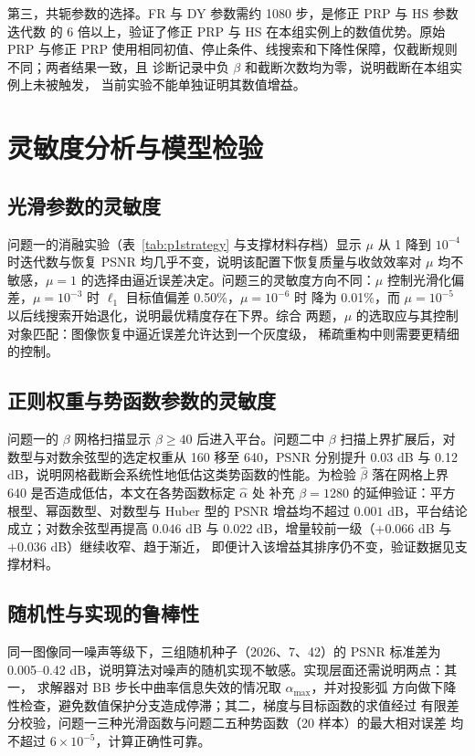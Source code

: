 \documentclass[withoutpreface,bwprint]{cumcmthesis}
\begin{document}
第三，共轭参数的选择。FR 与 DY 参数需约 1080 步，是修正 PRP 与 HS 参数迭代数
的 6 倍以上，验证了修正 PRP 与 HS 在本组实例上的数值优势。原始 PRP 与修正 PRP
使用相同初值、停止条件、线搜索和下降性保障，仅截断规则不同；两者结果一致，且
诊断记录中负 $\beta$ 和截断次数均为零，说明截断在本组实例上未被触发，
当前实验不能单独证明其数值增益。

\section{灵敏度分析与模型检验}

\subsection{光滑参数的灵敏度}

问题一的消融实验（表~\ref{tab:p1strategy} 与支撑材料存档）显示 $\mu$ 从 1 降到
$10^{-4}$ 时迭代数与恢复 PSNR 均几乎不变，说明该配置下恢复质量与收敛效率对
$\mu$ 均不敏感，$\mu=1$ 的选择由逼近误差决定。问题三的灵敏度方向不同：$\mu$
控制光滑化偏差，$\mu=10^{-3}$ 时 $\ell_1$ 目标值偏差 0.50\%，$\mu=10^{-6}$ 时
降为 0.01\%，而 $\mu=10^{-5}$ 以后线搜索开始退化，说明最优精度存在下界。综合
两题，$\mu$ 的选取应与其控制对象匹配：图像恢复中逼近误差允许达到一个灰度级，
稀疏重构中则需要更精细的控制。

\subsection{正则权重与势函数参数的灵敏度}

问题一的 $\beta$ 网格扫描显示 $\beta\ge40$ 后进入平台。问题二中 $\beta$
扫描上界扩展后，对数型与对数余弦型的选定权重从 160 移至 640，PSNR 分别提升
0.03 dB 与 0.12 dB，说明网格截断会系统性地低估这类势函数的性能。为检验
$\hat\beta$ 落在网格上界 640 是否造成低估，本文在各势函数标定 $\hat\alpha$ 处
补充 $\beta=1280$ 的延伸验证：平方根型、幂函数型、对数型与 Huber 型的 PSNR
增益均不超过 $0.001$ dB，平台结论成立；对数余弦型再提高 $0.046$ dB 与
$0.022$ dB，增量较前一级（$+0.066$ dB 与 $+0.036$ dB）继续收窄、趋于渐近，
即便计入该增益其排序仍不变，验证数据见支撑材料。

\subsection{随机性与实现的鲁棒性}

同一图像同一噪声等级下，三组随机种子（2026、7、42）的 PSNR 标准差为
0.005--0.42 dB，说明算法对噪声的随机实现不敏感。实现层面还需说明两点：其一，
求解器对 BB 步长中曲率信息失效的情况取 $\alpha_{\max}$，并对投影弧
方向做下降性检查，避免数值保护分支造成停滞；其二，梯度与目标函数的求值经过
有限差分校验，问题一三种光滑函数与问题二五种势函数（20 样本）的最大相对误差
均不超过 $6\times10^{-5}$，计算正确性可靠。
\end{document}
